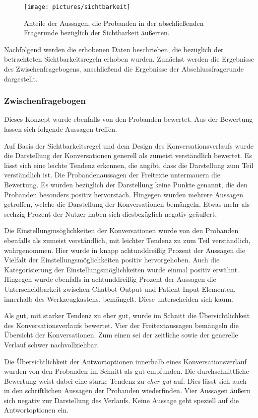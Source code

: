 \begin{figure}[h]
\centering
\texttt{[image: pictures/sichtbarkeit]}
\caption{Anteile der Aussagen, die Probanden in der abschließenden Fragerunde bezüglich der Sichtbarkeit äußerten.}
\label{sichtbarkeit}
\end{figure}

Nachfolgend werden die erhobenen Daten beschrieben, die bezüglich der betrachteten Sichtbarkeitsregeln erhoben wurden. Zunächst werden die Ergebnisse des Zwischenfragebogens, anschließend die Ergebnisse der Abschlussfragerunde dargestellt.

\subsubsection{Zwischenfragebogen}
Dieses Konzept wurde ebenfalls von den Probanden bewertet. Aus der Bewertung lassen sich folgende Aussagen treffen. 

Auf Basis der Sichtbarkeitsregel und dem Design des Konversationsverlaufs wurde die Darstellung der Konversationen generell als zumeist verständlich bewertet. Es lässt sich eine leichte Tendenz erkennen, die angibt, dass die Darstellung zum Teil verständlich ist. Die Probandenaussagen der Freitexte untermauern die Bewertung. Es wurden bezüglich der Darstellung keine Punkte genannt, die den Probanden besonders positiv hervorstach. Hingegen wurden mehrere Aussagen getroffen, welche die Darstellung der Konversationen bemängeln. Etwas mehr als sechzig Prozent der Nutzer haben sich diesbezüglich negativ geäußert.

Die Einstellungmsöglichkeiten der Konversationen wurde von den Probanden ebenfalls als zumeist verständlich, mit leichter Tendenz zu zum Teil verständlich, wahrgenommen. Hier wurde in knapp achtunddreißig Prozent der Aussagen die Vielfalt der Einstellungsmöglichkeiten positiv hervorgehoben. Auch die Kategorisierung der Einstellungsmöglichkeiten wurde einmal positiv erwähnt. Hingegen wurde ebenfalls in achtunddreißig Prozent der Aussagen die Unterscheidbarkeit zwischen Chatbot-Output und Patient-Input Elementen, innerhalb des Werkzeugkastens, bemängelt. Diese unterscheiden sich kaum. 

Als gut, mit starker Tendenz zu eher gut, wurde im Schnitt die Übersichtlichkeit des Konversationsverlaufs bewertet. Vier der Freitextaussagen bemängeln die Übersicht der Konversationen. Zum einen sei der zeitliche sowie der generelle Verlauf schwer nachvollziehbar.

Die Übersichtlichkeit der Antwortoptionen innerhalb eines Konversationsverlauf wurden von den Probanden im Schnitt als gut empfunden. Die durchschnittliche Bewertung weist dabei eine starke Tendenz zu \emph{eher gut} auf. Dies lässt sich auch in den schriftlichen Aussagen der Probanden wiederfinden. Vier Aussagen äußern sich negativ zur Darstellung des Verlaufs. Keine Aussage geht speziell auf die Antwortoptionen ein. 


